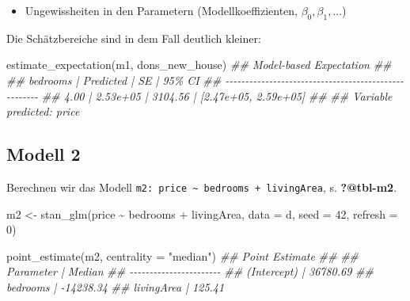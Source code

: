 \documentclass[
  a4paper,
  DIV=11]{scrreprt}
\newenvironment{Shaded}{\begin{snugshade}}{\end{snugshade}}
\newcommand{\AttributeTok}[1]{\textcolor[rgb]{0.40,0.45,0.13}{#1}}
\newcommand{\DecValTok}[1]{\textcolor[rgb]{0.68,0.00,0.00}{#1}}
\newcommand{\DocumentationTok}[1]{\textcolor[rgb]{0.37,0.37,0.37}{\textit{#1}}}
\newcommand{\FunctionTok}[1]{\textcolor[rgb]{0.28,0.35,0.67}{#1}}
\newcommand{\NormalTok}[1]{\textcolor[rgb]{0.00,0.23,0.31}{#1}}
\newcommand{\OtherTok}[1]{\textcolor[rgb]{0.00,0.23,0.31}{#1}}
\newcommand{\SpecialCharTok}[1]{\textcolor[rgb]{0.37,0.37,0.37}{#1}}
\newcommand{\StringTok}[1]{\textcolor[rgb]{0.13,0.47,0.30}{#1}}
\providecommand{\tightlist}{%
  \setlength{\itemsep}{0pt}\setlength{\parskip}{0pt}}\usepackage{longtable,booktabs,array}
\theoremstyle{definition}
\theoremstyle{remark}
\begin{document}
\begin{itemize}
\tightlist
\item
  Ungewissheiten in den Parametern (Modellkoeffizienten,
  \(\beta_0, \beta_1, ...\))
\end{itemize}

Die Schätzbereiche sind in dem Fall deutlich kleiner:

\begin{Shaded}
\begin{Highlighting}[]
\FunctionTok{estimate\_expectation}\NormalTok{(m1, dons\_new\_house)}
\DocumentationTok{\#\# Model{-}based Expectation}
\DocumentationTok{\#\# }
\DocumentationTok{\#\# bedrooms | Predicted |      SE |               95\% CI}
\DocumentationTok{\#\# {-}{-}{-}{-}{-}{-}{-}{-}{-}{-}{-}{-}{-}{-}{-}{-}{-}{-}{-}{-}{-}{-}{-}{-}{-}{-}{-}{-}{-}{-}{-}{-}{-}{-}{-}{-}{-}{-}{-}{-}{-}{-}{-}{-}{-}{-}{-}{-}{-}{-}{-}{-}{-}}
\DocumentationTok{\#\# 4.00     |  2.53e+05 | 3104.56 | [2.47e+05, 2.59e+05]}
\DocumentationTok{\#\# }
\DocumentationTok{\#\# Variable predicted: price}
\end{Highlighting}
\end{Shaded}

\hypertarget{modell-2}{%
\subsection{Modell 2}\label{modell-2}}

Berechnen wir das Modell
\texttt{m2:\ price\ \textasciitilde{}\ bedrooms\ +\ livingArea}, s.
\textbf{?@tbl-m2}.

\begin{Shaded}
\begin{Highlighting}[]
\NormalTok{m2 }\OtherTok{\textless{}{-}} \FunctionTok{stan\_glm}\NormalTok{(price }\SpecialCharTok{\textasciitilde{}}\NormalTok{ bedrooms }\SpecialCharTok{+}\NormalTok{ livingArea, }
               \AttributeTok{data =}\NormalTok{ d, }
               \AttributeTok{seed =} \DecValTok{42}\NormalTok{,}
               \AttributeTok{refresh =} \DecValTok{0}\NormalTok{)}

\FunctionTok{point\_estimate}\NormalTok{(m2, }\AttributeTok{centrality =} \StringTok{"median"}\NormalTok{)}
\DocumentationTok{\#\# Point Estimate}
\DocumentationTok{\#\# }
\DocumentationTok{\#\# Parameter   |    Median}
\DocumentationTok{\#\# {-}{-}{-}{-}{-}{-}{-}{-}{-}{-}{-}{-}{-}{-}{-}{-}{-}{-}{-}{-}{-}{-}{-}}
\DocumentationTok{\#\# (Intercept) |  36780.69}
\DocumentationTok{\#\# bedrooms    | {-}14238.34}
\DocumentationTok{\#\# livingArea  |    125.41}
\end{Highlighting}
\end{Shaded}
\end{document}
